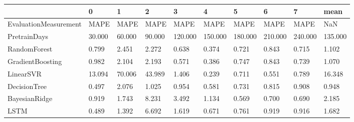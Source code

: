 \begin{tabular}{llllllllll}
\toprule
{} &      0 &      1 &      2 &       3 &       4 &       5 &       6 &       7 &    mean \\
\midrule
EvaluationMeasurement &   MAPE &   MAPE &   MAPE &    MAPE &    MAPE &    MAPE &    MAPE &    MAPE &     NaN \\
PretrainDays          & 30.000 & 60.000 & 90.000 & 120.000 & 150.000 & 180.000 & 210.000 & 240.000 & 135.000 \\
RandomForest          &  0.799 &  2.451 &  2.272 &   0.638 &   0.374 &   0.721 &   0.843 &   0.715 &   1.102 \\
GradientBoosting      &  0.982 &  2.104 &  2.193 &   0.571 &   0.386 &   0.747 &   0.843 &   0.739 &   1.070 \\
LinearSVR             & 13.094 & 70.006 & 43.989 &   1.406 &   0.239 &   0.711 &   0.551 &   0.789 &  16.348 \\
DecisionTree          &  0.497 &  2.076 &  1.025 &   0.954 &   0.581 &   0.731 &   0.815 &   0.908 &   0.948 \\
BayesianRidge         &  0.919 &  1.743 &  8.231 &   3.492 &   1.134 &   0.569 &   0.700 &   0.690 &   2.185 \\
LSTM                  &  0.489 &  1.392 &  6.692 &   1.619 &   0.671 &   0.761 &   0.919 &   0.916 &   1.682 \\
\bottomrule
\end{tabular}
